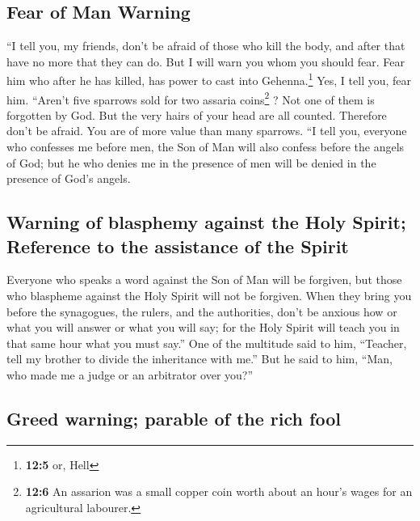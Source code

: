 \hypertarget{fear-of-man-warning}{%
\subsection{Fear of Man Warning}\label{fear-of-man-warning}}

 ``I tell you, my friends, don't be afraid of those who
kill the body, and after that have no more that they can do.
 But I will warn you whom you should fear. Fear him who
after he has killed, has power to cast into Gehenna.\footnote{\textbf{12:5}
  or, Hell} Yes, I tell you, fear him.  ``Aren't five
sparrows sold for two assaria coins\footnote{\textbf{12:6} An assarion
  was a small copper coin worth about an hour's wages for an
  agricultural labourer.} ? Not one of them is forgotten by God.
 But the very hairs of your head are all counted.
Therefore don't be afraid. You are of more value than many sparrows.
 ``I tell you, everyone who confesses me before men, the
Son of Man will also confess before the angels of God; 
but he who denies me in the presence of men will be denied in the
presence of God's angels.

\hypertarget{warning-of-blasphemy-against-the-holy-spirit-reference-to-the-assistance-of-the-spirit}{%
\subsection{Warning of blasphemy against the Holy Spirit; Reference to
the assistance of the
Spirit}\label{warning-of-blasphemy-against-the-holy-spirit-reference-to-the-assistance-of-the-spirit}}

 Everyone who speaks a word against the Son of Man will
be forgiven, but those who blaspheme against the Holy Spirit will not be
forgiven.  When they bring you before the synagogues, the
rulers, and the authorities, don't be anxious how or what you will
answer or what you will say;  for the Holy Spirit will
teach you in that same hour what you must say.''  One of
the multitude said to him, ``Teacher, tell my brother to divide the
inheritance with me.''  But he said to him, ``Man, who
made me a judge or an arbitrator over you?''

\hypertarget{greed-warning-parable-of-the-rich-fool}{%
\subsection{Greed warning; parable of the rich
fool}\label{greed-warning-parable-of-the-rich-fool}}

